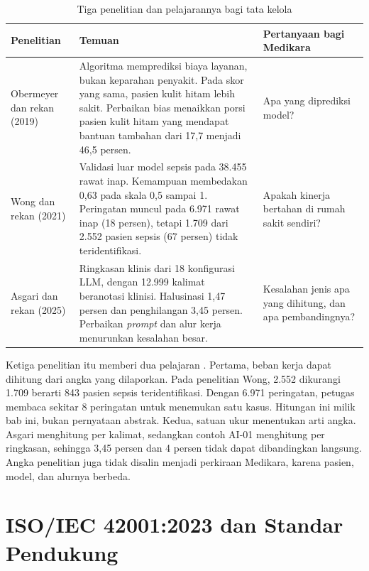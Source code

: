 \begin{table}[!htb]
  \centering\small
  \caption{Tiga penelitian dan pelajarannya bagi tata kelola}\label{tab:ch11-penelitian}
  \begin{tabularx}{\textwidth}{|>{\raggedright\arraybackslash}p{}|>{\raggedright\arraybackslash}X|>{\raggedright\arraybackslash}p{}|}
    \hline
    \textbf{Penelitian} & \textbf{Temuan} & \textbf{Pertanyaan bagi Medikara} \\ \hline
    Obermeyer dan rekan (2019) & Algoritma memprediksi biaya layanan, bukan keparahan penyakit. Pada
    skor yang sama, pasien kulit hitam lebih sakit. Perbaikan bias menaikkan porsi pasien kulit
    hitam yang mendapat bantuan tambahan dari 17,7 menjadi 46,5 persen. & Apa yang diprediksi
    model? \\ \hline
    Wong dan rekan (2021) & Validasi luar model sepsis pada 38.455 rawat inap. Kemampuan membedakan
    0,63 pada skala 0,5 sampai 1. Peringatan muncul pada 6.971 rawat inap (18 persen), tetapi 1.709
    dari 2.552 pasien sepsis (67 persen) tidak teridentifikasi. & Apakah kinerja bertahan di rumah
    sakit sendiri? \\ \hline
    Asgari dan rekan (2025) & Ringkasan klinis dari 18 konfigurasi LLM, dengan 12.999 kalimat
    beranotasi klinisi. Halusinasi 1,47 persen dan penghilangan 3,45 persen. Perbaikan
    \textit{prompt} dan alur kerja menurunkan kesalahan besar. & Kesalahan jenis apa yang dihitung,
    dan apa pembandingnya? \\ \hline
  \end{tabularx}
\end{table}

Ketiga penelitian itu memberi dua pelajaran \cite{c11-obermeyer2019,c11-wong2021,c11-asgari2025}.
Pertama, beban kerja dapat dihitung dari angka yang dilaporkan. Pada penelitian Wong, 2.552
dikurangi 1.709 berarti 843 pasien sepsis teridentifikasi. Dengan 6.971 peringatan, petugas membaca
sekitar 8 peringatan untuk menemukan satu kasus. Hitungan ini milik bab ini, bukan pernyataan
abstrak. Kedua, satuan ukur menentukan arti angka. Asgari menghitung per kalimat, sedangkan contoh
AI-01 menghitung per ringkasan, sehingga 3,45 persen dan 4 persen tidak dapat dibandingkan langsung.
Angka penelitian juga tidak disalin menjadi perkiraan Medikara, karena pasien, model, dan alurnya
berbeda.

\section{ISO/IEC 42001:2023 dan Standar Pendukung}

